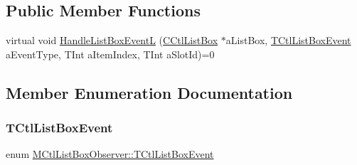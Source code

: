 \subsection*{Public Member Functions}
\begin{DoxyCompactItemize}
\item 
virtual void \hyperlink{classMCtlListBoxObserver_a346b02a3826ff1f15a61082e38dab958}{Handle\+List\+Box\+EventL} (\hyperlink{classCCtlListBox}{C\+Ctl\+List\+Box} $\ast$a\+List\+Box, \hyperlink{classMCtlListBoxObserver_ab9551a8e542c692650a2d4254418597f}{T\+Ctl\+List\+Box\+Event} a\+Event\+Type, T\+Int a\+Item\+Index, T\+Int a\+Slot\+Id)=0
\end{DoxyCompactItemize}


\subsection{Member Enumeration Documentation}
\mbox{\label{classMCtlListBoxObserver_ab9551a8e542c692650a2d4254418597f}} 
\subsubsection{\texorpdfstring{T\+Ctl\+List\+Box\+Event}{TCtlListBoxEvent}}
{\footnotesize\ttfamily enum \hyperlink{classMCtlListBoxObserver_ab9551a8e542c692650a2d4254418597f}{M\+Ctl\+List\+Box\+Observer\+::\+T\+Ctl\+List\+Box\+Event}}

